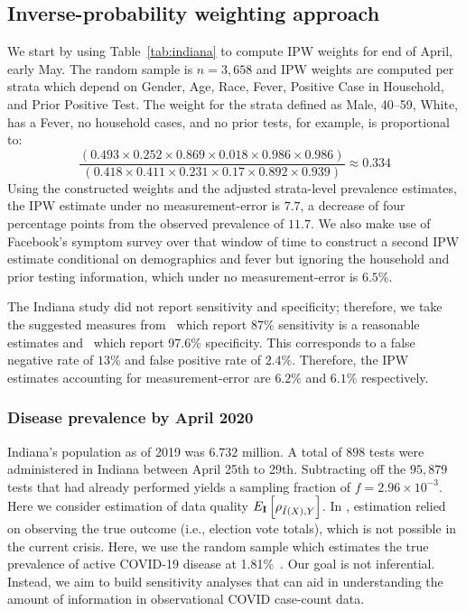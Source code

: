 \documentclass[11pt]{amsart}
\numberwithin{equation}{section}
\theoremstyle{plain}
\def\I{\bf I}
\begin{document}
\subsection{Inverse-probability weighting approach}
\label{section:ipwapproach}



We start by using Table~\ref{tab:indiana} to compute IPW weights for end of April, early May.  The random sample is $n=3,658$ and IPW weights are computed per strata which depend on Gender, Age, Race, Fever, Positive Case in Household, and Prior Positive Test.  The weight for the strata defined as Male, 40--59, White, has a Fever, no household cases, and no prior tests, for example, is proportional to:
$$
\frac{\left( 0.493 \times 0.252 \times 0.869 \times 0.018 \times 0.986 \times 0.986 \right)}{\left(0.418 \times 0.411 \times 0.231 \times 0.17 \times 0.892 \times 0.939 \right)} \approx 0.334
$$
Using the constructed weights and the adjusted strata-level prevalence estimates, the IPW estimate under no measurement-error is $7.7$, a decrease of four percentage points from the observed prevalence of $11.7$. We also make use of Facebook's symptom survey over that window of time to construct a second IPW estimate conditional on demographics and fever but ignoring the household and prior testing information, which under no measurement-error is $6.5$\%.

The Indiana study did not report sensitivity and specificity; therefore, we take the suggested measures from~\cite{Arevalo2020} which report 87\% sensitivity is a reasonable estimates and~\cite{Cohen2020} which report 97.6\% specificity.  This corresponds to a false negative rate of $13$\% and false positive rate of $2.4\%$.  Therefore, the IPW estimates accounting for measurement-error are $6.2\%$ and $6.1\%$ respectively.

\subsubsection{Disease prevalence by April 2020}

Indiana's population as of 2019 was $6.732$ million.  A total of $898$ tests were administered in Indiana between April 25th to 29th. Subtracting off the $95,879$ tests that had already performed yields a sampling fraction of $f = 2.96 \times 10^{-3}$.  Here we consider estimation of data quality $E_{\I} \left[ \rho_{\tilde I(X),Y} \right]$. In \cite{Meng2018}, estimation relied on observing the true outcome (i.e., election vote totals), which is not possible in the current crisis.  Here, we use the random sample which estimates the true prevalence of active COVID-19 disease at 1.81\%~\cite{Yiannoutsos2021}.  Our goal is not inferential. Instead, we aim to build sensitivity analyses that can aid in understanding the amount of information in observational COVID case-count data.
\end{document}
